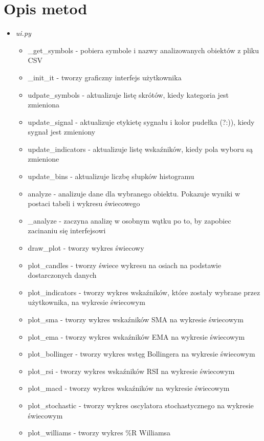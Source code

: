 \documentclass[12pt]{article}
\begin{document}
	\section{Opis metod}\label{sec:uzyte-metody}
	\begin{itemize}
	\item \textit{ui.py}
		\begin{itemize}
			\item \_get\_symbols - pobiera symbole i nazwy analizowanych obiektów z pliku CSV
			\item \_init\_it - tworzy graficzny interfejs użytkownika
			\item udpate\_symbols - aktualizuje listę skrótów, kiedy kategoria jest zmieniona
			\item update\_signal - aktualizuje etykietę sygnału i kolor pudełka (?:)), kiedy sygnał jest zmieniony
			\item update\_indicators - aktualizuje listę wskaźników, kiedy pola wyboru są zmienione
			\item update\_bins - aktualizuje liczbę słupków histogramu
			\item analyze - analizuje dane dla wybranego obiektu.
			Pokazuje wyniki w postaci tabeli i wykresu świecowego
			\item \_analyze - zaczyna analizę w osobnym wątku po to, by zapobiec zacinaniu się interfejsowi
			\item draw\_plot - tworzy wykres świecowy
			\item plot\_candles - tworzy świece wykresu na osiach na podstawie dostarczonych danych
			\item plot\_indicators - tworzy wykres wskaźników, które zostały wybrane przez użytkownika, na wykresie świecowym
			\item plot\_sma - tworzy wykres wskaźników SMA na wykresie świecowym
			\item plot\_ema - tworzy wykres wskaźników EMA na wykresie świecowym
			\item plot\_bollinger - tworzy wykres wstęg Bollingera na wykresie świecowym
			\item plot\_rsi - tworzy wykres wskaźników RSI na wykresie świecowym
			\item plot\_macd - tworzy wykres wskaźników na wykresie świecowym
			\item plot\_stochastic - tworzy wykres oscylatora stochastycznego na wykresie świecowym
			\item plot\_williams - tworzy wykres \%R Williamsa
		\end{itemize}
	\end{itemize}
\end{document}
